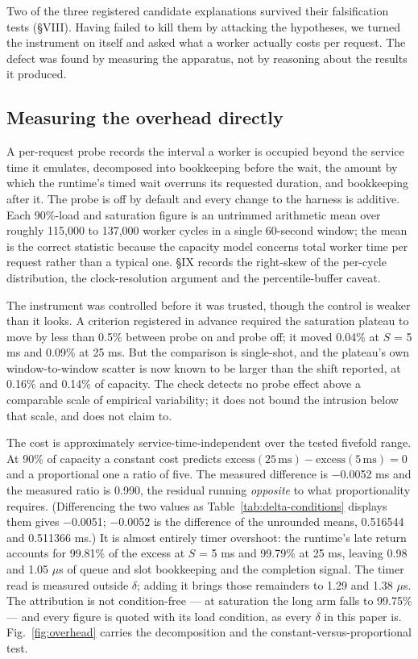\documentclass{ieeeaccess}
\begin{document}
Two of the three registered candidate explanations survived their falsification tests (\S{}VIII). Having failed to kill them by attacking the hypotheses, we turned the instrument on itself and asked what a worker actually costs per request. The defect was found by measuring the apparatus, not by reasoning about the results it produced.

\subsection{Measuring the overhead directly}

A per-request probe records the interval a worker is occupied beyond the service time it emulates, decomposed into bookkeeping before the wait, the amount by which the runtime's timed wait overruns its requested duration, and bookkeeping after it. The probe is off by default and every change to the harness is additive. Each 90\%-load and saturation figure is an untrimmed arithmetic mean over roughly 115,000 to 137,000 worker cycles in a single 60-second window; the mean is the correct statistic because the capacity model concerns total worker time per request rather than a typical one. \S{}IX records the right-skew of the per-cycle distribution, the clock-resolution argument and the percentile-buffer caveat.

The instrument was controlled before it was trusted, though the control is weaker than it looks. A criterion registered in advance required the saturation plateau to move by less than 0.5\% between probe on and probe off; it moved 0.04\% at $S$ = 5 ms and 0.09\% at 25 ms. But the comparison is single-shot, and the plateau's own window-to-window scatter is now known to be larger than the shift reported, at 0.16\% and 0.14\% of capacity. The check detects no probe effect above a comparable scale of empirical variability; it does not bound the intrusion below that scale, and does not claim to.

The cost is approximately service-time-independent over the tested fivefold range. At 90\% of capacity a constant cost predicts $\mathrm{excess}(25\,\mathrm{ms}) - \mathrm{excess}(5\,\mathrm{ms}) = 0$ and a proportional one a ratio of five. The measured difference is $-$0.0052 ms and the measured ratio is 0.990, the residual running \textit{opposite} to what proportionality requires. (Differencing the two values as Table~\ref{tab:delta-conditions} displays them gives $-$0.0051; $-$0.0052 is the difference of the unrounded means, 0.516544 and 0.511366 ms.) It is almost entirely timer overshoot: the runtime's late return accounts for 99.81\% of the excess at $S$ = 5 ms and 99.79\% at 25 ms, leaving 0.98 and 1.05 $\mu$s of queue and slot bookkeeping and the completion signal. The timer read is measured outside $\delta$; adding it brings those remainders to 1.29 and 1.38 $\mu$s. The attribution is not condition-free --- at saturation the long arm falls to 99.75\% --- and every figure is quoted with its load condition, as every $\delta$ in this paper is. Fig.~\ref{fig:overhead} carries the decomposition and the constant-versus-proportional test.
\end{document}
